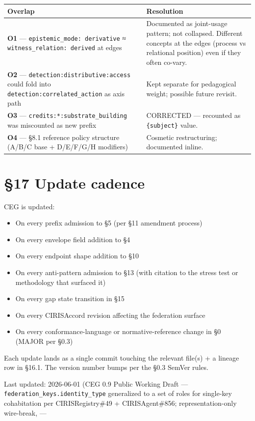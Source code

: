 \documentclass[11pt]{article}
\begin{document}
{\footnotesize
\begin{longtable}{|p{8.0cm}|p{8.0cm}|}\hline
\textbf{Overlap} & \textbf{Resolution} \\ \hline\endhead
\textbf{O1} — \texttt{epistemic\_mode: derivative} ≈ \texttt{witness\_relation: derived} at edges & Documented as joint-usage pattern; not collapsed. Different concepts at the edges (process vs relational position) even if they often co-vary. \\ \hline
\textbf{O2} — \texttt{detection:distributive:access} could fold into \texttt{detection:correlated\_action} as axis path & Kept separate for pedagogical weight; possible future revisit. \\ \hline
\textbf{O3} — \texttt{credits:*:substrate\_building} was miscounted as new prefix & CORRECTED — recounted as \texttt{\{subject\}} value. \\ \hline
\textbf{O4} — §8.1 reference policy structure (A/B/C base + D/E/F/G/H modifiers) & Cosmetic restructuring; documented inline. \\ \hline
\end{longtable}}


\clearpage


\section*{§17 Update cadence}


CEG is updated:


\begin{itemize}\setlength\itemsep{0pt}
\item On every prefix admission to §5 (per §11 amendment process)
\item On every envelope field addition to §4
\item On every endpoint shape addition to §10
\item On every anti-pattern admission to §13 (with citation to the stress test or methodology that surfaced it)
\item On every gap state transition in §15
\item On every CIRISAccord revision affecting the federation surface
\item On every conformance-language or normative-reference change in §0 (MAJOR per §0.3)
\end{itemize}


Each update lands as a single commit touching the relevant file(s) + a lineage row in §16.1. The version number bumps per the §0.3 SemVer rules.


Last updated: 2026-06-01 (CEG 0.9 Public Working Draft — \texttt{federation\_keys.identity\_type} generalized to a set of roles for single-key cohabitation per CIRISRegistry\#49 + CIRISAgent\#856; representation-only wire-break, ---



\clearpage
\end{document}
